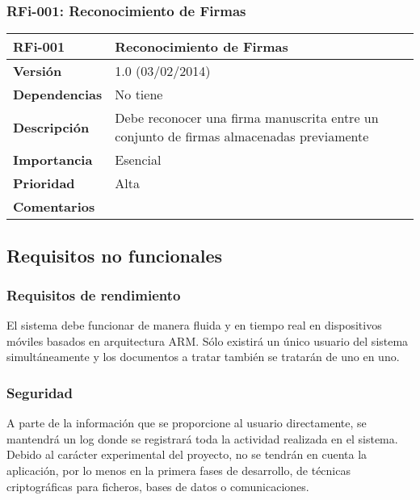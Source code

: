 \subsubsection*{RFi-001: Reconocimiento de Firmas}
\begin{tabular}{|p{3cm}|p{11.5cm}|}
\hline
\textbf{RFi-001}        & \textbf{Reconocimiento de Firmas}                                                                          \\ \hline
\textbf{Versión}        & 1.0 (03/02/2014)                                                                                           \\ \hline
\textbf{Dependencias}   & No tiene                                                                                                   \\ \hline
\textbf{Descripción}    & Debe reconocer una firma manuscrita entre un conjunto de firmas almacenadas previamente                    \\ \hline
\textbf{Importancia}    & Esencial                                                                                                   \\ \hline
\textbf{Prioridad}      & Alta                                                                                                       \\ \hline
\textbf{Comentarios}    &                                                                                                            \\ \hline
\end{tabular}


\subsection{Requisitos no funcionales}
\subsubsection{Requisitos de rendimiento}
El sistema debe funcionar de manera fluida y en tiempo real en dispositivos móviles basados en arquitectura ARM. Sólo existirá un único usuario del sistema simultáneamente y los documentos a tratar también se tratarán de uno en uno.
\subsubsection{Seguridad}
A parte de la información que se proporcione al usuario directamente, se mantendrá un log donde se registrará toda la actividad realizada en el sistema.
Debido al carácter experimental del proyecto, no se tendrán en cuenta la aplicación, por lo menos en la primera fases de desarrollo, de técnicas criptográficas para ficheros, bases de datos o comunicaciones.
